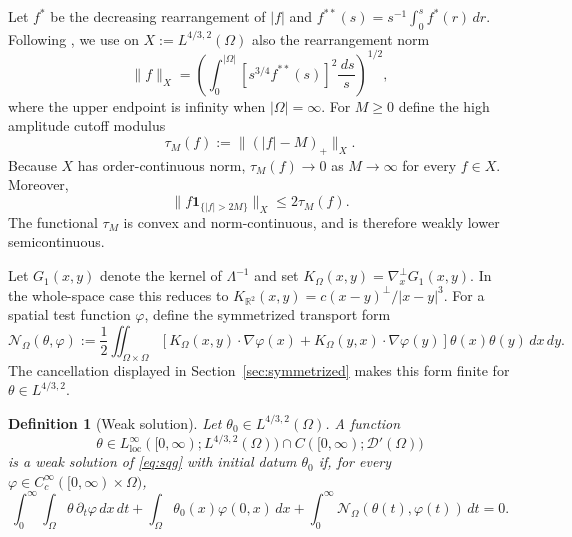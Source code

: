 \documentclass[11pt,reqno]{amsproc}
\newtheorem{definition}{Definition}[section]
\newcommand{\R}{\mathbb R}
\newcommand{\Om}{\Omega}
\newcommand{\one}{\mathbf 1}
\newcommand{\dd}{\,d}
\begin{document}
Let $f^*$ be the decreasing rearrangement of $|f|$ and
$f^{**}(s)=s^{-1}\int_0^s f^*(r)\dd r$.  Following
\cite[Chapter~2]{BennettSharpley1988}, we use on
$X:=L^{4/3,2}(\Om)$ also the rearrangement norm
\begin{equation}\label{eq:fully-symmetric-lorentz-norm}
 \|f\|_X=
 \left(\int_0^{|\Om|}
 [s^{3/4}f^{**}(s)]^2\frac{\dd s}{s}\right)^{1/2},
\end{equation}
where the upper endpoint is infinity when $|\Om|=\infty$.  For $M\ge0$
define the high amplitude cutoff modulus
\begin{equation}\label{eq:tail-modulus}
  \tau_M(f):=\bigl\|(|f|-M)_+\bigr\|_X.
\end{equation}
Because $X$ has order-continuous norm, $\tau_M(f)\to0$ as $M\to\infty$ for
every $f\in X$.  Moreover,
\begin{equation}\label{eq:superlevel-by-modulus}
  \|f\one_{\{|f|>2M\}}\|_X\le2\tau_M(f).
\end{equation}
The functional $\tau_M$ is convex and norm-continuous, and is therefore weakly
lower semicontinuous.

Let $G_1(x,y)$ denote the kernel of $\Lambda^{-1}$ and set
$K_\Om(x,y)=\nabla_x^\perp G_1(x,y)$.  In the whole-space case this reduces to
$K_{\R^2}(x,y)=c(x-y)^\perp/|x-y|^3$.  For a spatial test function $\varphi$,
define the symmetrized transport form
\begin{equation}\label{eq:intro-transport-form}
  \mathcal N_\Om(\theta,\varphi)
  :=\frac12\iint_{\Om\times\Om}
  \left[K_\Om(x,y)\cdot\nabla\varphi(x)
  +K_\Om(y,x)\cdot\nabla\varphi(y)\right]
  \theta(x)\theta(y)\dd x\dd y.
\end{equation}
The cancellation displayed in Section~\ref{sec:symmetrized} makes this form
finite for $\theta\in L^{4/3,2}$.

\begin{definition}[Weak solution]\label{def:weak-solution}
Let $\theta_0\in L^{4/3,2}(\Om)$.  A function
\[
  \theta\in L^\infty_{\mathrm{loc}}
  ([0,\infty);L^{4/3,2}(\Om))
  \cap C([0,\infty);\mathcal D'(\Om))
\]
is a weak solution of \eqref{eq:sqg} with initial datum $\theta_0$ if, for every
$\varphi\in C_c^\infty([0,\infty)\times\Om)$,
\begin{equation}\label{eq:weak-solution-definition}
  \int_0^\infty\!\int_\Om
  \theta\,\partial_t\varphi\dd x\dd t
  +\int_\Om\theta_0(x)\varphi(0,x)\dd x
  +\int_0^\infty\mathcal N_\Om(\theta(t),\varphi(t))\dd t=0.
\end{equation}
\end{definition}
\end{document}
